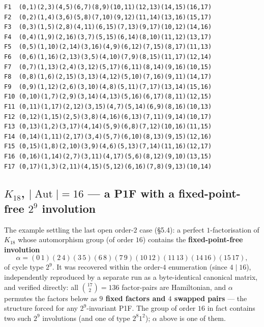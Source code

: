 \documentclass[11pt,reqno]{amsart}
\theoremstyle{plain}
\theoremstyle{definition}
\numberwithin{theorem}{section}
\newcommand{\Aut}{\operatorname{Aut}}
\begin{document}
{\footnotesize\begin{verbatim}
F1  (0,1)(2,3)(4,5)(6,7)(8,9)(10,11)(12,13)(14,15)(16,17)
F2  (0,2)(1,4)(3,6)(5,8)(7,10)(9,12)(11,14)(13,16)(15,17)
F3  (0,3)(1,5)(2,8)(4,11)(6,15)(7,13)(9,17)(10,12)(14,16)
F4  (0,4)(1,9)(2,16)(3,7)(5,15)(6,14)(8,10)(11,12)(13,17)
F5  (0,5)(1,10)(2,14)(3,16)(4,9)(6,12)(7,15)(8,17)(11,13)
F6  (0,6)(1,16)(2,13)(3,5)(4,10)(7,9)(8,15)(11,17)(12,14)
F7  (0,7)(1,13)(2,4)(3,12)(5,17)(6,11)(8,14)(9,16)(10,15)
F8  (0,8)(1,6)(2,15)(3,13)(4,12)(5,10)(7,16)(9,11)(14,17)
F9  (0,9)(1,12)(2,6)(3,10)(4,8)(5,11)(7,17)(13,14)(15,16)
F10 (0,10)(1,7)(2,9)(3,14)(4,13)(5,16)(6,17)(8,11)(12,15)
F11 (0,11)(1,17)(2,12)(3,15)(4,7)(5,14)(6,9)(8,16)(10,13)
F12 (0,12)(1,15)(2,5)(3,8)(4,16)(6,13)(7,11)(9,14)(10,17)
F13 (0,13)(1,2)(3,17)(4,14)(5,9)(6,8)(7,12)(10,16)(11,15)
F14 (0,14)(1,11)(2,17)(3,4)(5,7)(6,10)(8,13)(9,15)(12,16)
F15 (0,15)(1,8)(2,10)(3,9)(4,6)(5,13)(7,14)(11,16)(12,17)
F16 (0,16)(1,14)(2,7)(3,11)(4,17)(5,6)(8,12)(9,10)(13,15)
F17 (0,17)(1,3)(2,11)(4,15)(5,12)(6,16)(7,8)(9,13)(10,14)
\end{verbatim}}

\subsection{$K_{18}$, $|\Aut|=16$ --- a P1F with a fixed-point-free $2^9$ involution}

The example settling the last open order-$2$ case (\S5.4): a perfect $1$-factorisation of
$K_{18}$ whose automorphism group (of order $16$) contains the \textbf{fixed-point-free
involution}
\[
\alpha=(0\,1)(2\,4)(3\,5)(6\,8)(7\,9)(10\,12)(11\,13)(14\,16)(15\,17),
\]
of cycle type $2^9$. It was recovered within the order-$4$ enumeration (since $4\mid 16$),
independently reproduced by a separate run as a byte-identical canonical matrix, and
verified directly: all $\binom{17}{2}=136$ factor-pairs are Hamiltonian, and $\alpha$
permutes the factors below as \textbf{$9$ fixed factors and $4$ swapped pairs} --- the structure
forced for any $2^9$-invariant P1F. The group of order $16$ in fact contains two such $2^9$
involutions (and one of type $2^8 1^2$); $\alpha$ above is one of them.
\end{document}
